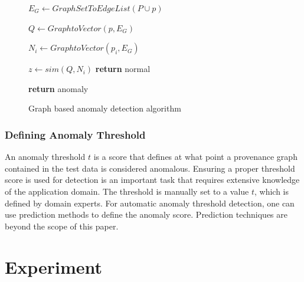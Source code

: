 \begin{figure}[h!]
\begin{algorithmic}[1]


\State $E_G \gets GraphSetToEdgeList(P \cup p)$

\State $Q \gets GraphtoVector(p, E_G)$ 

\State $N_i \gets GraphtoVector(p_i, E_G)$

\State $z \gets sim(Q, N_i)$
\State \textbf{return} normal

\EndIf

\EndFor	

\State \textbf{return} anomaly
\EndProcedure



\end{algorithmic}


\caption{Graph based anomaly detection algorithm}\label{alg:graph_anomaly}
\end{figure}






\subsubsection{Defining Anomaly Threshold}

An anomaly threshold $t$ is a score that defines at what point a provenance graph contained in the test data is considered anomalous. Ensuring a proper threshold score is used for detection is an important task that requires extensive knowledge of the application domain. The threshold is manually set to a value $t$, which is defined by domain experts. For automatic anomaly threshold detection, one can use prediction methods to define the anomaly score. Prediction techniques are beyond the scope of this paper. 

%






\section{Experiment}

